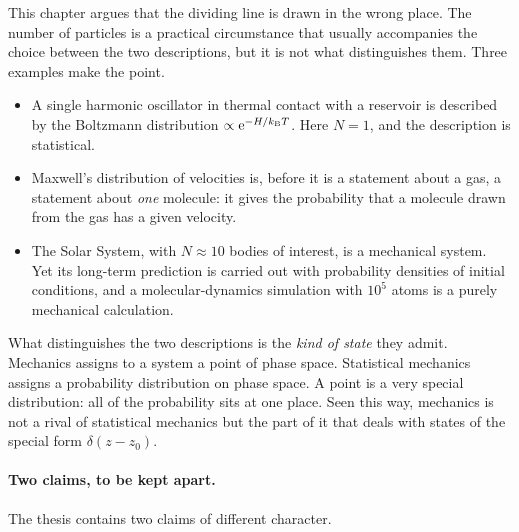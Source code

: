This chapter argues that the dividing line is drawn in the wrong place. The number of particles is a practical circumstance that usually accompanies the choice between the two descriptions, but it is not what distinguishes them. Three examples make the point.

\begin{itemize}[nosep]
\item A single harmonic oscillator in thermal contact with a reservoir is described by the Boltzmann distribution $\propto\mathrm{e}^{-H/k_{\mathrm B} T}$. Here $N=1$, and the description is statistical.
\item Maxwell's distribution of velocities is, before it is a statement about a gas, a statement about \emph{one} molecule: it gives the probability that a molecule drawn from the gas has a given velocity.
\item The Solar System, with $N\approx 10$ bodies of interest, is a mechanical system. Yet its long-term prediction is carried out with probability densities of initial conditions, and a molecular-dynamics simulation with $10^5$ atoms is a purely mechanical calculation.
\end{itemize}

What distinguishes the two descriptions is the \emph{kind of state} they admit. Mechanics assigns to a system a point of phase space. Statistical mechanics assigns a probability distribution on phase space. A point is a very special distribution: all of the probability sits at one place. Seen this way, mechanics is not a rival of statistical mechanics but the part of it that deals with states of the special form $\delta(z-z_0)$.

\begin{center}
\end{center}

\paragraph{Two claims, to be kept apart.} The thesis contains two claims of different character.

